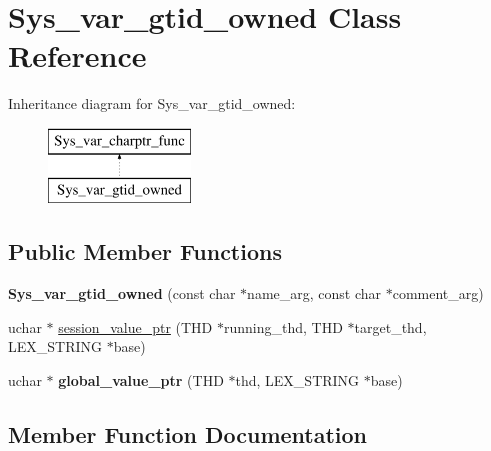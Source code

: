 \hypertarget{classSys__var__gtid__owned}{}\section{Sys\+\_\+var\+\_\+gtid\+\_\+owned Class Reference}
\label{classSys__var__gtid__owned}
Inheritance diagram for Sys\+\_\+var\+\_\+gtid\+\_\+owned\+:\begin{figure}[H]
\begin{center}
\leavevmode
\includegraphics[height=2.000000cm]{classSys__var__gtid__owned}
\end{center}
\end{figure}
\subsection*{Public Member Functions}
\begin{DoxyCompactItemize}
\item 
\mbox{\label{classSys__var__gtid__owned_a0936b12561999d3c33063b5168737fe2}} 
{\bfseries Sys\+\_\+var\+\_\+gtid\+\_\+owned} (const char $\ast$name\+\_\+arg, const char $\ast$comment\+\_\+arg)
\item 
uchar $\ast$ \mbox{\hyperlink{classSys__var__gtid__owned_a4eca8f703243a9e215184dd32b7bc2cf}{session\+\_\+value\+\_\+ptr}} (T\+HD $\ast$running\+\_\+thd, T\+HD $\ast$target\+\_\+thd, L\+E\+X\+\_\+\+S\+T\+R\+I\+NG $\ast$base)
\item 
\mbox{\label{classSys__var__gtid__owned_ae457d44b6225855e96d7887ad3e98785}} 
uchar $\ast$ {\bfseries global\+\_\+value\+\_\+ptr} (T\+HD $\ast$thd, L\+E\+X\+\_\+\+S\+T\+R\+I\+NG $\ast$base)
\end{DoxyCompactItemize}


\subsection{Member Function Documentation}
\mbox{\label{classSys__var__gtid__owned_a4eca8f703243a9e215184dd32b7bc2cf}} 
